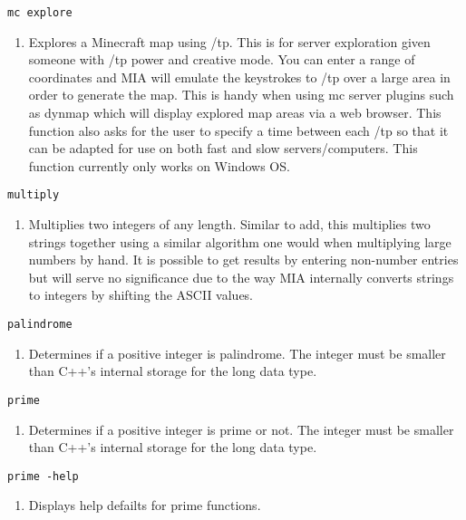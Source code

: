 \begin{lstlisting} 
mc explore
\end{lstlisting}
\begin{enumerate}
\item[]  Explores a Minecraft map using /tp. This is for server exploration given someone with /tp power and creative mode. You can enter a range of coordinates and MIA will emulate the keystrokes to /tp over a large area in order to generate the map. This is handy when using mc server plugins such as dynmap which will display explored map areas via a web browser. This function also asks for the user to specify a time between each /tp so that it can be adapted for use on both fast and slow servers/computers. This function currently only works on Windows OS.
\end{enumerate}
\begin{lstlisting} 
multiply  
\end{lstlisting}
\begin{enumerate}
	\item[] Multiplies two integers of any length. Similar to add, this multiplies two strings together using a similar algorithm one would when multiplying large numbers by hand. It is possible to get results by entering non-number entries but will serve no significance due to the way MIA internally converts strings to integers by shifting the ASCII values.
\end{enumerate}
\begin{lstlisting} 
palindrome   
\end{lstlisting}
\begin{enumerate}
	\item[] Determines if a positive integer is palindrome. The integer must be smaller than C++'s internal storage for the long data type.
\end{enumerate}
\begin{lstlisting} 
prime   
\end{lstlisting}
\begin{enumerate}
	\item[] Determines if a positive integer is prime or not. The integer must be smaller than C++'s internal storage for the long data type.
\end{enumerate}
\begin{lstlisting} 
prime -help
\end{lstlisting}
\begin{enumerate}
	\item[]  Displays help defailts for prime functions.
\end{enumerate}
